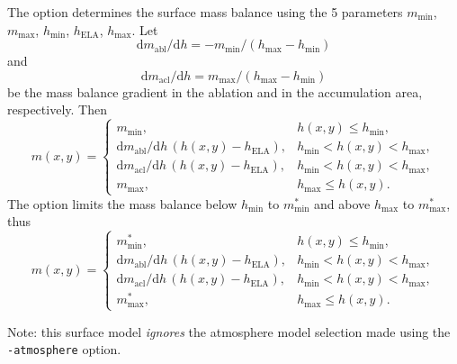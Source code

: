 \begin{itemize}
    The option  determines the surface mass balance using the 5 parameters $m_{\mathrm{min}}$, $m_{\mathrm{max}}$, $h_{\mathrm{min}}$, $h_{\mathrm{ELA}}$, $h_{\mathrm{max}}$. Let
    \begin{equation}
      \mathrm{d}m_{\mathrm{abl}}/\mathrm{d}h = - m_{\text{min}} / (h_{\text{max}} - h_{\text{min}})
    \end{equation}
    and
    \begin{equation}
      \mathrm{d}m_{\mathrm{acl}}/\mathrm{d}h = m_{\text{max}} / (h_{\text{max}} - h_{\text{min}})
    \end{equation}
    be the mass balance gradient in the ablation and in the accumulation area, respectively.  Then
    \begin{equation}
      m(x,y) = \begin{cases}
        m_{\text{min}}, & h(x,y) \le h_{\text{min}}, \\
        \mathrm{d}m_{\mathrm{abl}}/\mathrm{d}h\,(h(x,y) - h_{\text{ELA}}),
        &  h_{\text{min}} < h(x,y) < h_{\text{max}}, \\
        \mathrm{d}m_{\mathrm{acl}}/\mathrm{d}h\,(h(x,y) - h_{\text{ELA}}),
        &  h_{\text{min}} < h(x,y) < h_{\text{max}}, \\
        m_{\text{max}}, & h_{\text{max}} \le h(x,y). \end{cases}
    \end{equation}
    The option  limits the mass balance below $h_{\mathrm{min}}$ to $m^{*}_{\mathrm{min}}$ and above $h_{\mathrm{max}}$ to $m^{*}_{\mathrm{max}}$, thus
    \begin{equation}
      m(x,y) = \begin{cases}
        m^{*}_{\text{min}}, & h(x,y) \le h_{\text{min}}, \\
        \mathrm{d}m_{\mathrm{abl}}/\mathrm{d}h\,(h(x,y) - h_{\text{ELA}}),
        &  h_{\text{min}} < h(x,y) < h_{\text{max}}, \\
        \mathrm{d}m_{\mathrm{acl}}/\mathrm{d}h\,(h(x,y) - h_{\text{ELA}}),
        &  h_{\text{min}} < h(x,y) < h_{\text{max}}, \\
        m^{*}_{\text{max}}, & h_{\text{max}} \le h(x,y). \end{cases}
    \end{equation}

    Note: this surface model \emph{ignores} the atmosphere model selection made using the \texttt{-atmosphere} option.


\end{itemize}

